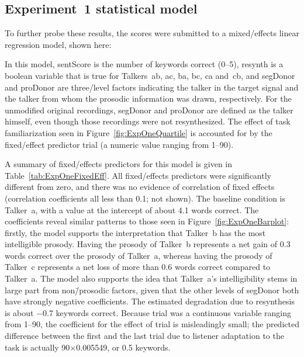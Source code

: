 \subsection{Experiment~1 statistical model}
To further probe these results, the scores were submitted to a mixed\-/effects linear regression model, shown here:%


In this model, {\inlinecode sentScore} is the number of keywords correct (0–5), {\inlinecode resynth} is a boolean variable that is true for Talkers~\ac{ab}, \ac{ac}, \ac{ba}, \ac{bc}, \ac{ca} and~\ac{cb}, and {\inlinecode segDonor} and {\inlinecode proDonor} are three\-/level factors indicating the talker in the target signal and the talker from whom the prosodic information was drawn, respectively.  For the unmodified original recordings, {\inlinecode segDonor} and {\inlinecode proDonor} are defined as the talker himself, even though those recordings were not resynthesized.  The effect of task familiarization seen in Figure~\ref{fig:ExpOneQuartile} is accounted for by the fixed\-/effect predictor {\inlinecode trial} (a numeric value ranging from 1–90).

A summary of fixed\-/effects predictors for this model is given in Table~\ref{tab:ExpOneFixedEff}.  All fixed\-/effects predictors were significantly different from zero, and there was no evidence of correlation of fixed effects (correlation coefficients all less than 0.1; not shown).  The baseline condition is Talker~\ac{a}, with a value at the intercept of about 4.1 words correct.  The coefficients reveal similar patterns to those seen in Figure~\ref{fig:ExpOneBarplot}: firstly, the model supports the interpretation that Talker~\ac{b} has the most intelligible prosody.  Having the prosody of Talker~\ac{b} represents a net gain of 0.3 words correct over the prosody of Talker~\ac{a}, whereas having the prosody of Talker~\ac{c} represents a net loss of more than 0.6 words correct compared to Talker~\ac{a}.  The model also supports the idea that Talker~\ac{a}’s intelligibility stems in large part from non\=/prosodic factors, given that the other levels of {\inlinecode segDonor} both have strongly negative coefficients.  The estimated degradation due to resynthesis is about −0.7 keywords correct.  Because trial was a continuous variable ranging from 1–90, the coefficient for the effect of trial is misleadingly small; the predicted difference between the first and the last trial due to listener adaptation to the task is actually 90×0.005549, or 0.5 keywords.

